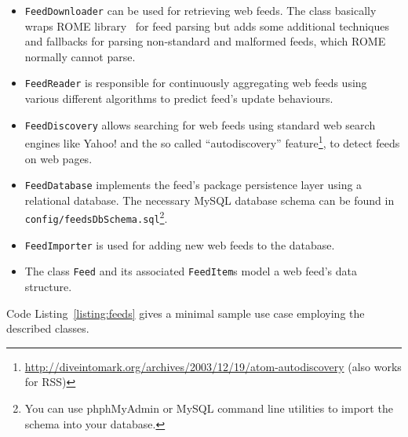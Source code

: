 \documentclass[a4paper,twoside]{book}      %
\begin{document}
\begin{itemize}

	\item \texttt{FeedDownloader} can be used for retrieving web feeds. The class basically wraps ROME library~\cite{rome} for feed parsing but adds some additional techniques and fallbacks for parsing non-standard and malformed feeds, which ROME normally cannot parse.

	\item \texttt{FeedReader} is responsible for continuously aggregating web feeds using various different algorithms to predict feed's update behaviours.

	\item \texttt{FeedDiscovery} allows searching for web feeds using standard web search engines like Yahoo! and the so called ``autodiscovery'' feature\footnote{\url{http://diveintomark.org/archives/2003/12/19/atom-autodiscovery} (also works for RSS)}, to detect feeds on web pages.

	\item \texttt{FeedDatabase} implements the feed's package persistence layer using a relational database. The necessary MySQL database schema can be found in \texttt{config/feedsDbSchema.sql}\footnote{You can use phphMyAdmin or MySQL command line utilities to import the schema into your database.}.

	\item \texttt{FeedImporter} is used for adding new web feeds to the database.

	\item The class \texttt{Feed} and its associated \texttt{FeedItem}s model a web feed's data structure.

\end{itemize}

Code Listing~\ref{listing:feeds} gives a minimal sample use case employing the described classes.
\end{document}
